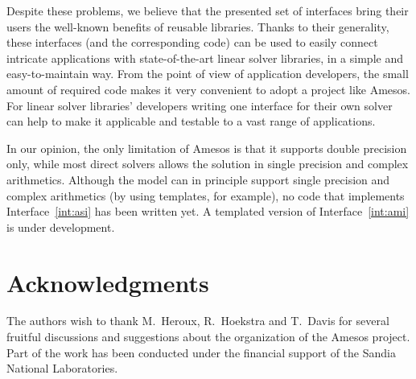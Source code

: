 \documentclass[acmtocl]{acmtrans2m}
\begin{document}
Despite these problems, we believe that the presented set of interfaces
bring their users the well-known benefits of reusable libraries. Thanks to
their generality, these interfaces (and the corresponding code) can be used to
easily connect intricate applications with state-of-the-art linear solver
libraries, in a simple and easy-to-maintain way. From the point of view of
application developers, the small amount of required code makes it very
convenient to adopt a project like Amesos. For linear solver
libraries' developers  writing one interface for their own solver can help to make it
applicable and testable to a vast range of applications.

In our opinion, the only limitation of Amesos is that it supports double
precision only, while most direct solvers allows the solution in single
precision and complex arithmetics.  Although the model can in principle
support single precision and complex arithmetics (by using templates, for
                                                  example), no code that
implements Interface~\ref{int:asi} has been written yet. A templated version
of Interface~\ref{int:ami} is under development.

\section*{Acknowledgments}

The authors wish to thank M.~Heroux, R.~Hoekstra and T.~Davis for several
fruitful discussions and suggestions about the organization of the Amesos
project. Part of the work has been conducted under the financial support of
the Sandia National Laboratories.



\end{document}
